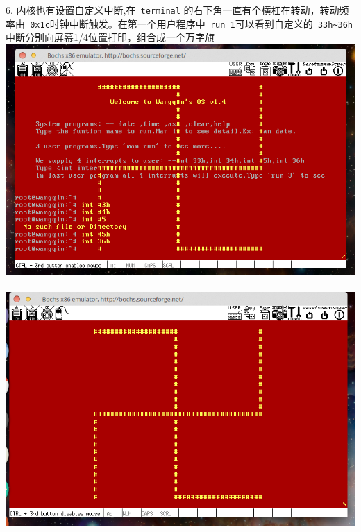\documentclass[a4paper]{article}
\begin{document}
{{6. 内核也有设置自定义中断,在\verb| terminal| 的右下角一直有个横杠在转动，转动频率由\verb| 0x1c|时钟中断触发。在第一个用户程序中\verb| run 1|可以看到自定义的\verb| 33h~36h|中断分别向屏幕1/4位置打印，组合成一个万字旗
{\center\includegraphics[scale=0.45]{Illustrations/allcustomint.png}}\\\\
{\center\includegraphics[scale=0.45]{Illustrations/usr2.png}}\\\\

}}
\end{document}

